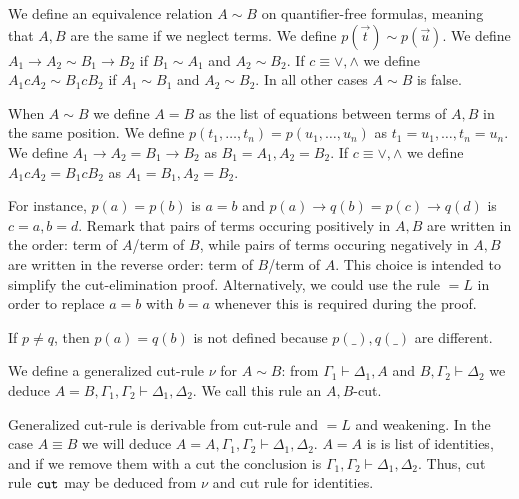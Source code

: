 \documentclass[a4paper,12pt]{article}
\newcommand{\setA}              { {\mathcal A} }
\newcommand{\cut}             { {\tt cut} }
\newcommand{\eqL}     {= \! \!  \!  L}
\begin{document}



We define an equivalence relation $A \sim B$ on quantifier-free formulas, meaning that $A, B$ are the same if we neglect terms. We define $p (\vec{t}) \sim p(\vec{u})$. We define $A_1 \rightarrow A_2 \sim B_1 \rightarrow B_2$ if $B_1 \sim A_1$ and $A_2 \sim B_2$. If $c \equiv \vee, \wedge$ we define $A_1 c A_2 \sim B_1c B_2$ if $A_1 \sim B_1$ and $A_2 \sim B_2$. In all other cases $A \sim B$ is false. 

When $A \sim B$ we define $A = B$ as the list of equations between terms of $A, B$ in the same position. We define $p(t_1, \ldots, t_n) = p(u_1,\ldots, u_n)$ as $t_1 = u_1, \ldots, t_n = u_n$. We define $A_1 \rightarrow A_2 = B_1 \rightarrow B_2$ as $B_1= A_1, A_2 = B_2$. If $c \equiv \vee, \wedge$ we define $A_1 c A_2 = B_1c B_2$ as $A_1 = B_1, A_2 = B_2$. 

For instance, $p(a)=p(b)$ is $a=b$ and $p(a)\rightarrow q(b) = p(c)\rightarrow q(d)$ is $c=a, b=d$. Remark that pairs of terms occuring positively in $A, B$ are written in the order: term of $A$/term of $B$, while pairs of terms occuring negatively in $A, B$ are written in the reverse order: term of $B$/term of $A$. This choice is intended to simplify the cut-elimination proof. Alternatively, we could use the rule $\eqL$ in order to replace $a=b$ with $b=a$ whenever this is required during the proof.

If $p \not = q$, then $p(a) = q(b)$ is not defined because $p(\_), q(\_)$ are different. 


We define a generalized cut-rule $\nu$ for $A \sim B$: from $\Gamma_1 \vdash \Delta_1,A$ and $B, \Gamma_2 \vdash \Delta_2$ we deduce  $A=B,\Gamma_1, \Gamma_2 \vdash \Delta_1, \Delta_2$. We call this rule an $A,B$-cut. 

Generalized cut-rule is derivable from cut-rule and $\eqL$ and weakening. In the case $A \equiv B$ we will deduce $A=A, \Gamma_1, \Gamma_2 \vdash \Delta_1, \Delta_2$. $A = A$ is is list of identities, and if we remove them with a cut the conclusion is  $\Gamma_1, \Gamma_2 \vdash \Delta_1, \Delta_2$. Thus, cut rule $\cut$ may be deduced from $\nu$ and cut rule for identities.  
\end{document}
